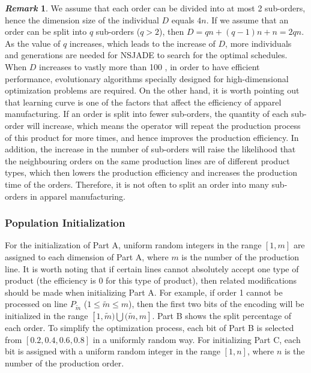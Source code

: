 \documentclass[journal]{IEEEtran}
\theoremstyle{definition}
\newtheorem{remark}{\it Remark}
\begin{document}
\begin{remark}
We assume that each order can be divided into at most 2 sub-orders, hence the dimension size of the individual $D$ equals $4n$. If we assume that an order can be split into $q$ sub-orders ($q>2$), then $D=qn+(q-1)n+n=2qn$. As the value of $q$ increases, which leads to the increase of $D$, more individuals and generations are needed for NSJADE to search for the optimal schedules. When $D$ increases to vastly more than 100 \cite{cheng2015competitive}, in order to have efficient performance, evolutionary algorithms specially designed for high-dimensional optimization problems are required.
On the other hand, it is worth pointing out that learning curve is one of the factors that affect the efficiency of apparel manufacturing. If an order is split into fewer sub-orders, the quantity of each sub-order will increase, which means the operator will repeat the production process of this product for more times, and hence improves the production efficiency.
In addition, the increase in the number of sub-orders will raise the likelihood that the neighbouring orders on the same production lines are of different product types, which then lowers the production efficiency and increases the production time of the orders.
Therefore, it is not often to split an order into many sub-orders in apparel manufacturing.
\end{remark}

\subsubsection{Population Initialization}
For the initialization of Part A, uniform random integers in the range $[1, m]$ are assigned to each dimension of Part A, where $m$ is the number of the production line.
It is worth noting that if certain lines cannot absolutely accept one type of product (the efficiency is 0 for this type of product), then related modifications should be made when initializing Part A. For example, if order 1 cannot be processed on line $P_{\tilde{m}}$ ($1\leq\tilde{m}\leq m$), then the first two bits of the encoding will be initialized in the range $[1, \tilde{m})\bigcup(\tilde{m}, m]$.
Part B shows the split percentage of each order. To simplify the optimization process, each bit of Part B is selected from $[0.2, 0.4, 0.6, 0.8]$ in a uniformly random way. For initializing Part C, each bit is assigned with a uniform random integer in the range $[1, n]$, where $n$ is the number of the production order.
\end{document}

